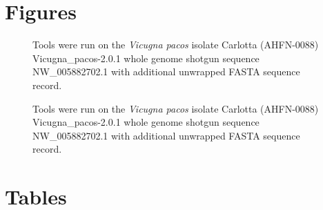 \documentclass{bmcart}
\begin{document}
\begin{backmatter}




\section*{Figures}
  \begin{figure}[h!]
  \caption{
      Tools were run on the \textit{Vicugna pacos} isolate Carlotta (AHFN-0088) Vicugna\_pacos-2.0.1 whole genome shotgun sequence NW\_005882702.1 with additional unwrapped FASTA sequence record.}
      \end{figure}

\begin{figure}[h!]
  \caption{
     Tools were run on the \textit{Vicugna pacos} isolate Carlotta (AHFN-0088) Vicugna\_pacos-2.0.1 whole genome shotgun sequence NW\_005882702.1 with additional unwrapped FASTA sequence record.}
      \end{figure}


\section*{Tables}


\end{backmatter}
\end{document}
